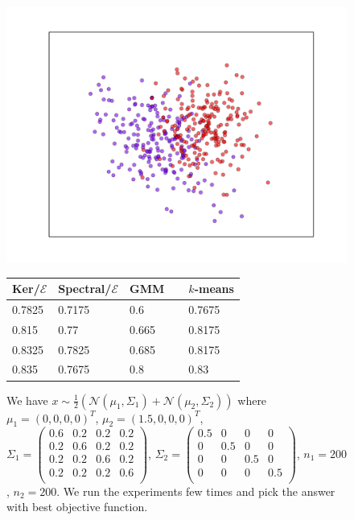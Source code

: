 \documentclass[aps,preprint,nofootinbib,floatfix]{revtex4-1}
\begin{document}
\begin{figure}[h]
\begin{minipage}{.49\textwidth}
\includegraphics[scale=.45]{gauss_4d1.pdf}
\end{minipage}
\begin{minipage}{.49\textwidth}
\begin{tabular}{ l l l l}
\hline
Ker/$\mathcal{E}$ & Spectral/$\mathcal{E}$ & GMM~~ & $k$-means \\
\hline
0.7825 &
0.7175 &
0.6 &
0.7675 \\
0.815 &
0.77 &
0.665 &
0.8175 \\
0.8325 &
0.7825 & 
0.685 & 
0.8175 \\
0.835 &
0.7675 &
0.8 & 
0.83 \\
\hline
\end{tabular}
\end{minipage}
\caption{\label{fig:1dloggaus1}
We have $x \sim \tfrac{1}{2}\left( \mathcal{N}(\mu_1, \Sigma_1) +
\mathcal{N}(\mu_2, \Sigma_2)\right)$ where $\mu_1 = (0,0,0,0)^T$, 
$\mu_2=(1.5, 0,0,0)^T$,
$\Sigma_1 = 
\left( \begin{smallmatrix} 
0.6 & 0.2 & 0.2 & 0.2 \\ 
0.2 & 0.6 & 0.2 & 0.2 \\ 
0.2 & 0.2 & 0.6 & 0.2 \\ 
0.2 & 0.2 & 0.2 & 0.6 \\ 
\end{smallmatrix} \right)$, 
$\Sigma_2 = 
\left( \begin{smallmatrix} 
0.5 & 0 & 0 & 0 \\ 
0 & 0.5 & 0 & 0 \\ 
0 & 0 & 0.5 & 0 \\ 
0 & 0 & 0 & 0.5 \\ 
\end{smallmatrix} \right)$,
$n_1=200$, $n_2=200$.
We run the experiments few times and pick the answer with best
objective function.
}
\end{figure}
\end{document}
